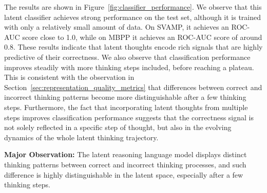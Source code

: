 \documentclass{article} %
\begin{document}
The results are shown in Figure~\ref{fig:classifier_performance}. We observe that this latent classifier achieves strong performance on the test set, although it is trained with only a relatively small amount of data. On SVAMP, it achieves an ROC-AUC score close to 1.0, while on MBPP it achieves an ROC-AUC score of around 0.8. These results indicate that latent thoughts encode rich signals that are highly predictive of their correctness.
%
We also observe that classification performance improves steadily with more thinking steps included, before reaching a plateau. This is consistent with the observation in Section~\ref{sec:representation_quality_metrics} that differences between correct and incorrect thinking patterns become more distinguishable after a few thinking steps. Furthermore, the fact that incorporating latent thoughts from multiple steps improves classification performance suggests that the correctness signal is not solely reflected in a specific step of thought, but also in the evolving dynamics of the whole latent thinking trajectory.
\begin{tcolorbox}[enhanced,
    colframe=blue!40!black,
    colback=blue!2!white,
    fonttitle=\bfseries,
  attach boxed title to top text left={xshift=30mm,yshift=-2.5mm},
  boxed title style={size=small,colframe=blue!40!black,colback=blue!40!black}]
\textbf{Major Observation:} The latent reasoning language model displays distinct thinking patterns between correct and incorrect thinking processes, and such difference is highly distinguishable in the latent space, especially after a few thinking steps.
\end{tcolorbox}
\end{document}
